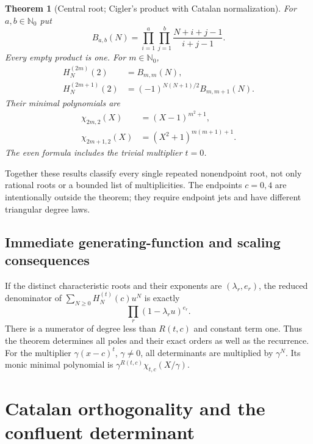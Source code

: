 \documentclass[11pt,a4paper]{article}
\numberwithin{equation}{section}
\newtheorem{theorem}{Theorem}[section]
\theoremstyle{definition}
\theoremstyle{remark}
\newcommand{\NN}{\mathbb N_0}
\newcommand{\cH}[2]{H_{#1}^{(#2)}}
\begin{document}
\begin{theorem}[Central root; Cigler's product with Catalan normalization]
\label{cyc:thm:central}
For $a,b\in\NN$ put
\begin{equation}\label{cyc:eq:rectangle}
 B_{a,b}(N)=\prod_{i=1}^{a}\prod_{j=1}^{b}
                    \frac{N+i+j-1}{i+j-1}.
\end{equation}
Every empty product is one.  For $m\in\NN$,
\begin{align}
 \cH N{2m}(2)&=B_{m,m}(N),\label{cyc:eq:centraleven}\\
 \cH N{2m+1}(2)&=(-1)^{N(N+1)/2}B_{m,m+1}(N).
 \label{cyc:eq:centralodd}
\end{align}
Their minimal polynomials are
\begin{align}
 \chi_{2m,2}(X)&=(X-1)^{m^2+1},\label{cyc:eq:centralevenchar}\\
 \chi_{2m+1,2}(X)&=(X^2+1)^{m(m+1)+1}.
 \label{cyc:eq:centraloddchar}
\end{align}
The even formula includes the trivial multiplier $t=0$.
\end{theorem}

Together these results classify every single repeated nonendpoint
root, not only rational roots or a bounded list of multiplicities.
The endpoints $c=0,4$ are intentionally outside the theorem; they
require endpoint jets and have different triangular degree laws.

\subsection{Immediate generating-function and scaling consequences}
If the distinct characteristic roots and their exponents are
$(\lambda_r,e_r)$, the reduced denominator of
$\sum_{N\ge0}\cH Nt(c)u^N$ is exactly
\begin{equation}\label{cyc:eq:GFden}
 \prod_r(1-\lambda_r u)^{e_r}.
\end{equation}
There is a numerator of degree less than $R(t,c)$ and constant term one.
Thus the theorem determines all poles and their exact orders as well
as the recurrence.  For the multiplier $\gamma(x-c)^t$, $\gamma\ne0$,
all determinants are multiplied by $\gamma^N$.  Its monic minimal
polynomial is $\gamma^{R(t,c)}\chi_{t,c}(X/\gamma)$.

\section{Catalan orthogonality and the confluent determinant}\label{cyc:sec:orthogonal}
\end{document}
